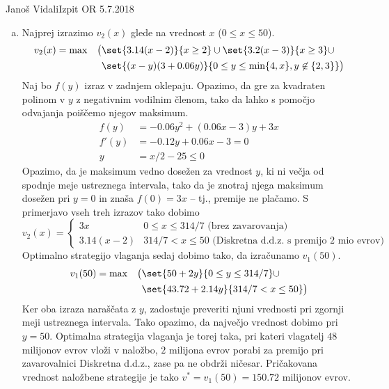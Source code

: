 \begin{naloga}{Janoš Vidali}{Izpit OR 5.7.2018}
\begin{odgovor}
\begin{enumerate}[(a)]
\item Najprej izrazimo $v_2(x)$ glede na vrednost $x$ ($0 \le x \le 50$).
\begin{alignat*}{2}
v_2(x) &= \max&\big(&\set{3.14 (x-2)}{x \ge 2} \cup \set{3.2 (x-3)}{x \ge 3} \cup \\
&&&{} \set{(x-y) (3 + 0.06 y)}{0 \le y \le \min\{4, x\}, y \not\in \{2, 3\}}\big)
\end{alignat*}
Naj bo $f(y)$ izraz v zadnjem oklepaju.
Opazimo, da gre za kvadraten polinom v $y$ z negativnim vodilnim členom,
tako da lahko s pomočjo odvajanja poiščemo njegov maksimum.
\begin{align*}
f(y)  &= -0.06 y^2 + (0.06x - 3) y + 3x \\
f'(y) &= -0.12 y + 0.06 x - 3 = 0 \\
y &= x/2 - 25 \le 0
\end{align*}
Opazimo, da je maksimum vedno dosežen za vrednost $y$,
ki ni večja od spod\-nje meje ustreznega intervala,
tako da je znotraj njega maksimum dosežen pri $y = 0$ in znaša $f(0) = 3x$
-- tj., premije ne plačamo.
S primerjavo vseh treh izrazov tako dobimo
$$
v_2(x) = \begin{cases}
3 x        & 0 \le x \le 314/7 \text{ (brez zavarovanja)} \\
3.14 (x-2) & 314/7 < x \le 50 \text{ (Diskretna d.d.z.~s premijo $2$ mio evrov)}
\end{cases}
$$
Optimalno strategijo vlaganja sedaj dobimo tako,
da izračunamo $v_1(50)$.
\begin{alignat*}{2}
v_1(50) &= \max&\big(&\set{50 + 2y}{0 \le y \le 314/7} \cup \\
&&&{} \set{43.72 + 2.14y}{314/7 < x \le 50}\big)
\end{alignat*}
Ker oba izraza naraščata z $y$,
zadostuje preveriti njuni vrednosti pri zgornji meji ustreznega intervala.
Tako opazimo, da največjo vrednost dobimo pri $y = 50$.
Optimalna strategija vlaganja je torej taka,
pri kateri vlagatelj $48$ milijonov evrov vloži v naložbo,
$2$ milijona evrov porabi za premijo pri zavarovalnici Diskretna d.d.z.,
zase pa ne obdrži ničesar.
Pričakovana vrednost naložbene strategije
je tako $v^* = v_1(50) = 150.72$ milijonov evrov.
\end{enumerate}
\end{odgovor}
\end{naloga}
